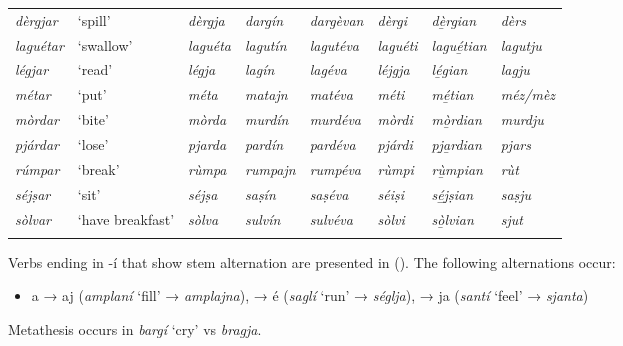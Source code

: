 \begin{sidewaystable}
\begin{tabularx}{\textwidth}{llllllll}
		\textit{dèrgjar} & `spill' & \textit{dèrgja} & \textit{dargín} & \textit{dargèvan} & \textit{dèrgi} & \textit{dè̱rgian}
		 & \textit{dèrs}\\
		\textit{laguétar} & `swallow' & \textit{laguéta} & \textit{lagutín} & \textit{lagutéva} & \textit{laguéti} & \textit{lagué̱tian} & \textit{lagutju}\\
		\textit{légjar} & `read' & \textit{légja} & \textit{lagín} & \textit{lagéva} & \textit{léjgja} & \textit{lé̱gian} & \textit{lagju}\\
		\textit{métar} & `put' & \textit{méta} & \textit{matajn} & \textit{matéva} & \textit{méti} & \textit{mé̱tian} & \textit{méz/mèz}\\
		\textit{mòrdar} & `bite' & \textit{mòrda} & \textit{murdín} & \textit{murdéva} & \textit{mòrdi} & \textit{mò̱rdian} & \textit{murdju}\\
		\textit{pjárdar} & `lose' & \textit{pjarda} & \textit{pardín} & \textit{pardéva} & \textit{pjárdi} & \textit{pj̱a̱rdian} & \textit{pjars}\\
		\textit{rúmpar} & `break' & \textit{rùmpa} & \textit{rumpajn} & \textit{rumpéva} & \textit{rùmpi} & \textit{rù̱mpian} & \textit{rùt}\\
		\textit{séjṣar} & `sit' & \textit{séjṣa}  &	\textit{saṣín} & \textit{saṣéva} & \textit{séiṣi} & \textit{sé̱j̱ṣian} & \textit{saṣju}\\
		\textit{sòlvar} & `have breakfast' & \textit{sòlva} & \textit{sulvín} & \textit{sulvéva} & \textit{sòlvi} & \textit{sò̱lvian} & \textit{sjut}\\
		\lspbottomrule
	\end{tabularx} 
\end{sidewaystable}

Verbs ending in -í that show stem alternation are presented in  (). The following alternations occur:

\begin{itemize}
	\item a → aj (\textit{amplaní} `fill' → \textit{amplajna}), → é (\textit{saglí} `run' → \textit{séglja}), → ja (\textit{santí} `feel' → \textit{sjanta})
\end{itemize}

Metathesis occurs in \textit{bargí} `cry' vs \textit{bragja}.

